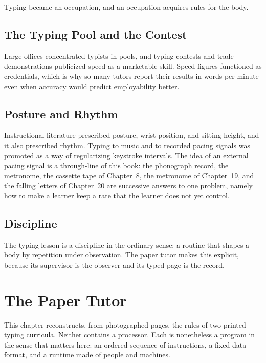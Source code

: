 Typing became an occupation, and an occupation acquires rules for the body.

\section{The Typing Pool and the Contest}

Large offices concentrated typists in pools, and typing contests and trade demonstrations publicized speed as a marketable skill.  Speed figures functioned as credentials, which is why so many tutors report their results in words per minute even when accuracy would predict employability better.

\section{Posture and Rhythm}

Instructional literature prescribed posture, wrist position, and sitting height, and it also prescribed rhythm. Typing to music and to recorded pacing signals was promoted as a way of regularizing keystroke intervals.  The idea of an external pacing signal is a through-line of this book: the phonograph record, the metronome, the cassette tape of Chapter~8, the metronome of Chapter~19, and the falling letters of Chapter~20 are successive answers to one problem, namely how to make a learner keep a rate that the learner does not yet control.

\section{Discipline}

The typing lesson is a discipline in the ordinary sense: a routine that shapes a body by repetition under observation. The paper tutor makes this explicit, because its supervisor is the observer and its typed page is the record.

\chapter{The Paper Tutor}
\label{ch:paper}

This chapter reconstructs, from photographed pages, the rules of two printed typing curricula. Neither contains a processor. Each is nonetheless a program in the sense that matters here: an ordered sequence of instructions, a fixed data format, and a runtime made of people and machines.

